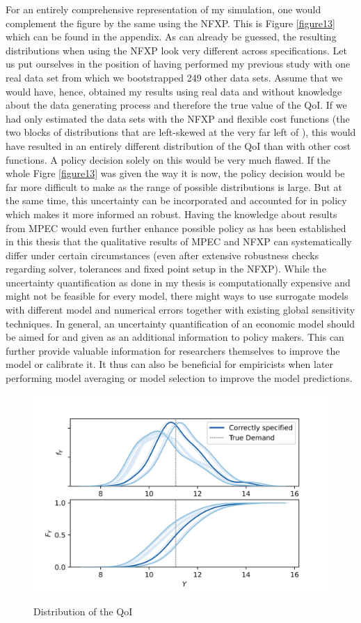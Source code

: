 For an entirely comprehensive representation of my simulation, one would complement the figure by the same using the NFXP. This is Figure \ref{figure13} which can be found in the appendix. As can already be guessed, the resulting distributions when using the NFXP look very different across specifications. Let us put ourselves in the position of having performed my previous study with one real data set from which we bootstrapped 249 other data sets. Assume that we would have, hence, obtained my results using real data and without knowledge about the data generating process and therefore the true value of the QoI. If we had only estimated the data sets with the NFXP and flexible cost functions (the two blocks of distributions that are left-skewed at the very far left of ), this would have resulted in an entirely different distribution of the QoI than with other cost functions. A policy decision solely on this would be very much flawed. If the whole Figre \ref{figure13} was given the way it is now, the policy decision would be far more difficult to make as the range of possible distributions is large. But at the same time, this uncertainty can be incorporated and accounted for in policy which makes it more informed an robust. Having the knowledge about results from MPEC would even further enhance possible policy as has been established in this thesis that the qualitative results of MPEC and NFXP can systematically differ under certain circumstances (even after extensive robustness checks regarding solver, tolerances and fixed point setup in the NFXP). While the uncertainty quantification as done in my thesis is computationally expensive and might not be feasible for every model, there might ways to use surrogate models with different model and numerical errors together with existing global sensitivity techniques. In general, an uncertainty quantification of an economic model should be aimed for and given as an additional information to policy makers. This can further provide valuable information for researchers themselves to improve the model or calibrate it. It thus can also be beneficial for empiricists when later performing model averaging or model selection to improve the model predictions.

\begin{figure}[H]
	\caption{Distribution of the QoI}
	\vspace*{-4mm}
	\centering
	\includegraphics[scale=0.9]{../figures/figure_11.png}
	\label{figure11}
\end{figure}
